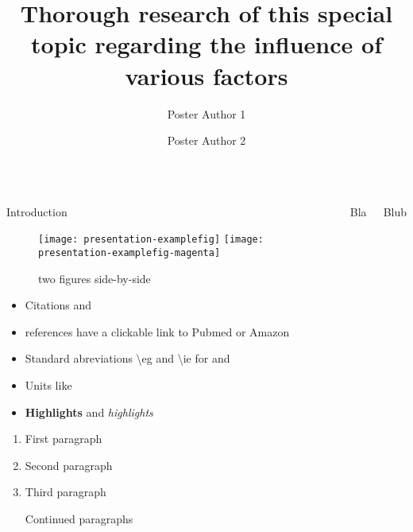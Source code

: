 \documentclass[english,xcolor=table,t
]{beamer}
\title{Thorough research of this special topic regarding the influence of
various factors}
\author{Poster Author 1 \and Poster Author 2}
\institute{Institute, Dept., University}
\begin{document}
\begin{frame}

\begin{columns}


\begin{block}{Introduction}


\begin{figure}
\texttt{[image: presentation-examplefig]}
\texttt{[image: presentation-examplefig-magenta]}
\caption{two figures side-by-side}
\end{figure}


\begin{itemize}
\tightlist
\item
  Citations \autocite{Macherey2006} and \textcite{Macherey2006}
\item
  references have a clickable link to Pubmed or Amazon
\item
  Standard abreviations \textbackslash{}eg and \textbackslash{}ie for
  \eg and \ie
\item
  Units like 
\item
  \textbf{Highlights} and \emph{highlights}
\end{itemize}


\begin{enumerate}
\def\labelenumi{\arabic{enumi}.}
\item
  First paragraph
\item
  Second paragraph
\item
  Third paragraph

  Continued paragraphs
\end{enumerate}

\end{block}

\begin{block}{Bla}

\lipsum[1]

\end{block}

\begin{block}{Blub}

\begin{columns}



\end{columns}
\end{block}
\end{columns}
\end{frame}
\end{document}
